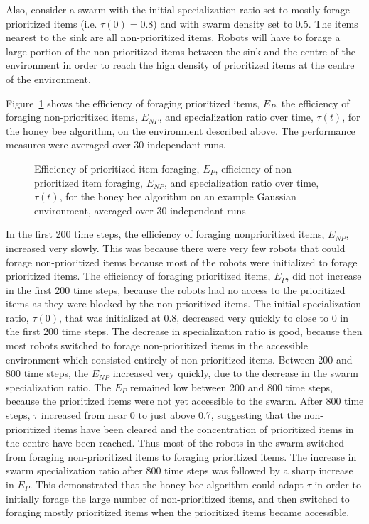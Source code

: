 Also, consider a swarm with the initial specialization ratio set to mostly forage prioritized items (i.e. $\tau(0)=0.8$) and with swarm density set to 0.5. The items nearest to the sink are all non-prioritized items. Robots will have to forage a large portion of the non-prioritized items between the sink and the centre of the environment in order to reach the high density of prioritized items at the centre of the environment. 


Figure~\ref{fig:gaussianhighdensityperformancehoneybee} shows the efficiency of foraging prioritized items, $E_P$, the efficiency of foraging non-prioritized items, $E_{NP}$, and specialization ratio over time, $\tau(t)$, for the honey bee algorithm, on the environment described above. The performance measures were averaged over 30 independant runs.


\begin{figure}[!htbp]
\centering
\small
\resizebox{\textwidth}{!}{}
\caption{Efficiency of prioritized item foraging, $E_P$, efficiency of non-prioritized item foraging, $E_{NP}$, and specialization ratio over time, $\tau(t)$, for the honey bee algorithm on an example Gaussian environment, averaged over 30 independant runs}
\label{fig:gaussianhighdensityperformancehoneybee}
\end{figure}

In the first 200 time steps, the efficiency of foraging nonprioritized items, $E_{NP}$, increased very slowly. This was because there were very few robots that could forage non-prioritized items because most of the robots were initialized to forage prioritized items. The efficiency of foraging prioritized items, $E_{P}$, did not increase in the first 200 time steps, because the robots had no access to the prioritized items as they were blocked by the non-prioritized items. The initial specialization ratio, $\tau(0)$, that was initialized at 0.8, decreased very quickly to close to 0 in the first 200 time steps. The decrease in specialization ratio is good, because then most robots switched to forage non-prioritized items in the accessible environment which consisted entirely of non-prioritized items. Between 200 and 800 time steps, the $E_{NP}$ increased very quickly, due to the decrease in the swarm specialization ratio. The $E_{P}$ remained low between 200 and 800 time steps, because the prioritized items were not yet accessible to the swarm. After 800 time steps, $\tau$ increased from near 0 to just above 0.7, suggesting that the non-prioritized items have been cleared and the concentration of prioritized items in the centre have been reached. Thus most of the robots in the swarm switched from foraging non-prioritized items to foraging prioritized items. The increase in swarm specialization ratio after 800 time steps was followed by a sharp increase in $E_P$. This demonstrated that the honey bee algorithm could adapt $\tau$ in order to initially forage the large number of non-prioritized items, and then switched to foraging mostly prioritized items when the prioritized items became accessible.

